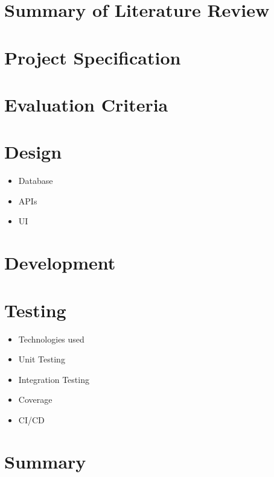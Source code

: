 \documentclass[12pt]{article}
\begin{document}
\section{Summary of Literature Review}
\section{Project Specification}
\section{Evaluation Criteria}
\section{Design}
\begin{itemize}
    \item Database
    \item APIs
    \item UI
\end{itemize}
\section{Development}
\section{Testing}
\begin{itemize}
    \item Technologies used
    \item Unit Testing
    \item Integration Testing
    \item Coverage
    \item CI/CD
\end{itemize}
\section{Summary}



\end{document}

